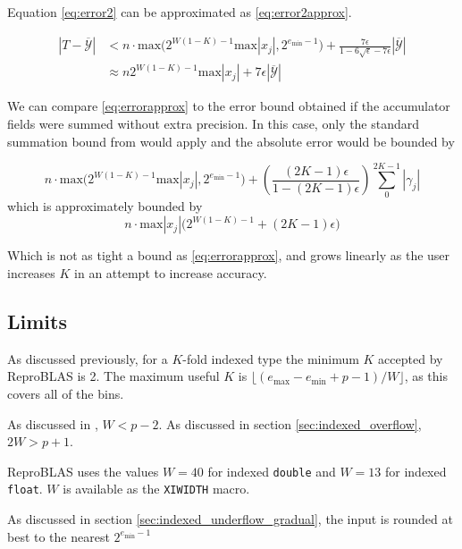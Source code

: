 \documentclass[12pt]{article}
\providecommand{\min}{\ensuremath{\text{min}}}
\providecommand{\max}{\ensuremath{\text{max}}}
\theoremstyle{definition}
\numberwithin{equation}{section}
\numberwithin{figure}{section}
\begin{document}
    Equation \eqref{eq:error2} can be approximated as  \eqref{eq:error2approx}.

    \begin{align}
      |T - \overline{\mathcal{Y}}| &< n \cdot \max\bigl(2^{W  (1 - K) - 1}  \max|x_j|, 2^{e_{\min} - 1}\bigr) + \frac{7\epsilon}{1 - 6 \sqrt \epsilon - 7\epsilon}  \left|\overline{\mathcal{Y}}\right| \nonumber \\
      &\approx n  2^{W  (1 - K) - 1} \max|x_j|+ 7 \epsilon \left|\overline{\mathcal{Y}}\right|
      \label{eq:error2approx}
    \end{align}

    We can compare  \eqref{eq:errorapprox} to the error bound obtained if the accumulator fields were summed without extra precision. In this case, only the standard summation bound from \cite{higham} would apply and the absolute error would be bounded by

    \begin{equation*}
    n \cdot \max\bigl(2^{W  (1 - K) - 1}  \max|x_j|, 2^{e_{\min} - 1}\bigr) + \left(\frac{(2  K - 1)  \epsilon}{1 - (2  K - 1)  \epsilon}\right)  \sum\limits_0^{2  K - 1}|\gamma_j|
    \end{equation*}
    which is approximately bounded by
    \begin{equation}
    n \cdot \max|x_j| \bigl(2^{W  (1 - K) - 1} + (2  K - 1)  \epsilon\bigr)
    \label{eq:baderrorapprox}
    \end{equation}

    Which is not as tight a bound as \eqref{eq:errorapprox}, and grows linearly as the user increases $K$ in an attempt to increase accuracy.

  \subsection{Limits}
    \label{sec:primitiveops_limits}
    As discussed previously, for a $K$-fold indexed type the minimum $K$ accepted by ReproBLAS is 2. The maximum useful $K$ is $\lfloor(e_{\max} - e_{\min} + p - 1)/W\rfloor$, as this covers all of the bins.

    As discussed in \cite{repsum}, $W < p - 2$. As discussed in section \ref{sec:indexed_overflow}, $2 W > p + 1$.

    ReproBLAS uses the values $W = 40$ for indexed \texttt{double} and $W = 13$ for indexed \texttt{float}. $W$ is available as the \texttt{XIWIDTH} macro.

    As discussed in section \ref{sec:indexed_underflow_gradual}, the input is rounded at best to the nearest $2^{e_{\min} - 1}$
\end{document}
